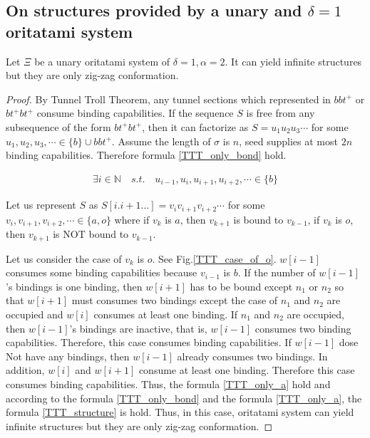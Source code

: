 \subsection{On structures provided by a unary and $\delta = 1$ oritatami system}
\begin{theorem}[$\delta= 1, \alpha=2$]
Let $\Xi$ be a unary oritatami system of $\delta = 1, \alpha = 2$. It can yield infinite structures but they are only zig-zag conformation.
\end{theorem}

\begin{proof}
By Tunnel Troll Theorem, any tunnel sections which represented in $bbt^+$ or $bt^+bt^+$ consume binding capabilities. If the sequence $S$ is free from any subsequence of the form $bt^+bt^+$, then it can factorize as $S = u_1 u_2 u_3 \cdots$ for some $u_1 , u_2 , u_3 , \cdots \in \{b\} \cup bbt^+$. Assume the length of $\sigma$ is $n$, seed supplies at most $2n$ binding capabilities. Therefore formula \ref{TTT_only_bond} hold.

\begin{eqnarray}
  \exists i \in \mathbb{N} \quad s.t. \quad u_{i-1} , u_i , u_{i+1} , u_{i+2} , \cdots \in \{ b \}
  \label{TTT_only_bond}
\end{eqnarray}


Let us represent $S$ as $S[i.i+1...] = v_i v_{i+1} v_{i+2} \cdots$ for some $v_i, v_{i+1}, v_{i+2}, \cdots \in \{ a, o\}$ where if $v_k$ is $a$, then $v_{k+1}$ is bound to $v_{k-1}$, if $v_k$ is $o$, then $v_{k+1}$ is NOT bound to $v_{k-1}$.


Let us consider the case of $v_k$ is $o$. See Fig.\ref{TTT_case_of_o}. $w[i-1]$ consumes some binding capabilities because $v_{i-1}$ is $b$. If the number of $w[i-1]$'s bindings is one binding, then $w[i+1]$ has to be bound except $n_1$ or $n_2$ so that $w[i+1]$ must consumes two bindings except the case of $n_1$ and $n_2$ are occupied and $w[i]$ consumes at least one binding. If $n_1$ and $n_2$ are occupied, then $w[i-1]$'s bindings are inactive, that is, $w[i-1]$ consumes two binding capabilities. Therefore, this case consumes binding capabilities. If $w[i-1]$ dose Not have any bindings, then $w[i-1]$ already consumes two bindings. In addition, $w[i]$ and $w[i+1]$ consume at least one binding. Therefore this case consumes binding capabilities. Thus, the formula \ref{TTT_only_a} hold and according to the formula \ref{TTT_only_bond} and the formula \ref{TTT_only_a}, the formula \ref{TTT_structure} is hold. Thus, in this case, oritatami system can yield infinite structures but they are only zig-zag conformation.

\end{proof}

